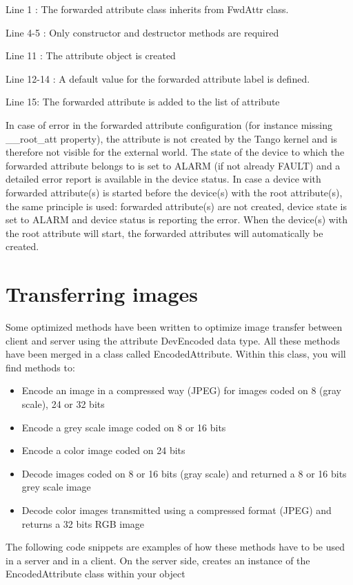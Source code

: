 Line 1 : The forwarded attribute class inherits from FwdAttr class.

Line 4-5 : Only constructor and destructor methods are required

Line 11 : The attribute object is created

Line 12-14 : A default value for the forwarded attribute label is
defined.

Line 15: The forwarded attribute is added to the list of attribute

In case of error in the forwarded attribute configuration (for instance
missing \_\_root\_att property), the attribute is not created by the
Tango kernel and is therefore not visible for the external world.
The state of the device to which the forwarded attribute belongs to
is set to ALARM (if not already FAULT) and a detailed error report
is available in the device status. In case a device with forwarded
attribute(s) is started before the device(s) with the root attribute(s),
the same principle is used: forwarded attribute(s) are not created,
device state is set to ALARM and device status is reporting the error.
When the device(s) with the root attribute will start, the forwarded
attributes will automatically be created. 


\section{Transferring images}

Some optimized methods have been written to optimize image transfer
between client and server using the attribute DevEncoded
data type. All these methods have been merged in a class called EncodedAttribute.
Within this class, you will find methods to:
\begin{itemize}
\item Encode an image in a compressed way (JPEG) for images
coded on 8 (gray scale), 24 or 32 bits
\item Encode a grey scale image coded on 8 or 16 bits
\item Encode a color image coded on 24 bits
\item Decode images coded on 8 or 16 bits (gray scale) and returned a 8
or 16 bits grey scale image
\item Decode color images transmitted using a compressed format (JPEG) and
returns a 32 bits RGB image
\end{itemize}
The following code snippets are examples of how these methods have
to be used in a server and in a client. On the server side, creates
an instance of the EncodedAttribute class
within your object


